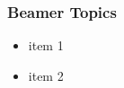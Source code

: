\documentclass[main.tex]{subfiles}
\begin{document}
    \begin{frame}
    \frametitle{Beamer Topics}

    \begin{itemize}
      \item<1->item 1
      \item<2->item 2
    \end{itemize}

  \end{frame}
\end{document}
